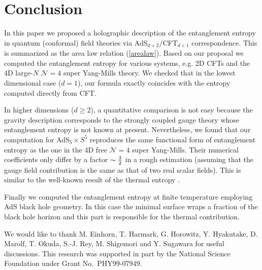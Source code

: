 \documentclass[twocolumn,amsmath,amssymb,nofootinbib,eqsecnum,tighten,prd]{revtex4}
\def\frac#1#2{{#1\over #2}}
\def\f {\frac}
\def\frac#1#2{{#1\over #2}}
\begin{document}
\section{Conclusion}

In this paper we proposed a holographic description of the
entanglement entropy in quantum (conformal) field theories via
AdS$_{d+2}$/CFT$_{d+1}$ correspondence. This is summarized as the area
law relation (\ref{arealaw}). Based on our proposal we computed the
entanglement entropy for various systems,
e.g. 2D CFTs and the 4D
large-$N$ ${\mathcal{N}}=4$ super Yang-Mills theory. We
checked that in the lowest dimensional case ($d=1$), our formula
exactly coincides with the entropy computed directly from CFT.

In higher dimensions ($d\geq 2$),
a quantitative comparison is not easy because the gravity description
corresponds to the strongly coupled gauge theory whose entanglement
entropy is not known at present. Nevertheless, we found that
our computation for AdS$_5\times S^5$ reproduces the same functional
form of entanglement entropy as the one in the 4D free
${\mathcal{N}}=4$ super Yang-Mills. Their numerical coefficients
only differ by a factor $\sim \f{3}{2}$ in a rough estimation (assuming
that the gauge field contribution is the same as that of two
real scalar fields). This is similar to the well-known result of
the thermal entropy \cite{GKP}.

Finally we computed the entanglement entropy at finite temperature
employing AdS black hole geometry. In this case the minimal surface
wraps a fraction of the black hole horizon and this part is
responsible for the thermal contribution.




We would like to thank M. Einhorn, T. Harmark, G. Horowitz, Y. Hyakutake, D.
Marolf, T. Okuda, S.-J. Rey, M. Shigemori and Y. Sugawara for useful
discussions. This research was supported in part by the National
Science Foundation under Grant No.\ PHY99-07949.
\end{document}
